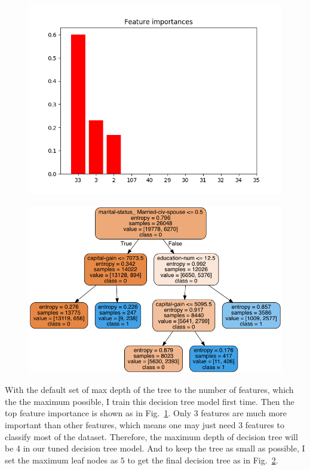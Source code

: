 \documentclass[         %
aps,                    %
prl,                    %
showpacs,               %
superscriptaddress,    %
nofootinbib,            %
twocolumn,             %
showkeys,               %
preprintnumbers,        %
floatfix               %
]{revtex4-1}               %
\begin{document}
\begin{figure}[h!]
  \centering \includegraphics[width=\linewidth]{../FI_income.png}
  \caption{\label{fig:FI_Income}}
\end{figure}

\begin{figure}[h!]
  \centering \includegraphics[width=\linewidth]{../dt_income.png}
  \caption{\label{fig:dt_Income}}
\end{figure}

With the default set of max depth of the tree to the number of features, which the the maximum possible, I train this decision tree model first time. Then the top feature importance is shown as in Fig.~\ref{fig:FI_Income}. 
Only $3$ features are much more important than other features, which means one may just need $3$ features to classify most of the dataset.
Therefore, the maximum depth of decision tree will be 4 in our tuned decision tree model. And to keep the tree as small as possible, I set the maximum leaf nodes as $5$ to get the final decision tree as in Fig.~\ref{fig:dt_Income}.
\end{document}
